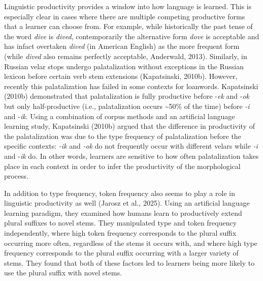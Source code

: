 \documentclass[
  letterpaper,
  DIV=11,
  numbers=noendperiod]{scrartcl}
\begin{document}
Linguistic productivity provides a window into how language is learned.
This is especially clear in cases where there are multiple competing
productive forms that a learner can choose from. For example, while
historically the past tense of the word \emph{dive} is \emph{dived},
contemporarily the alternative form \emph{dove} is acceptable and has
infact overtaken \emph{dived} (in American English) as the more frequent
form (while \emph{dived} also remains perfectly acceptable, Anderwald,
2013). Similarly, in Russian velar stops undergo palatalization without
exceptions in the Russian lexicon before certain verb stem extensions
(Kapatsinski, 2010b). However, recently this palatalization has failed
in some contexts for loanwords. Kapatsinski (2010b) demonstrated that
palatalization is fully productive before -\emph{ek} and -\emph{ok} but
only half-productive (i.e., palatalization occurs \textasciitilde50\% of
the time) before \emph{-i} and -\emph{ik}. Using a combination of corpus
methods and an artificial language learning study, Kapatsinski (2010b)
argued that the difference in productivity of the palatalization was due
to the type frequency of palatalization before the specific contexts:
\emph{-ik} and \emph{-ok} do not frequently occur with different velars
while \emph{-i} and -\emph{ik} do. In other words, learners are
sensitive to how often palatalization takes place in each context in
order to infer the productivity of the morphological process.

In addition to type frequency, token frequency also seems to play a role
in linguistic productivity as well (Jarosz et al., 2025). Using an
artificial language learning paradigm, they examined how humans learn to
productively extend plural suffixes to novel stems. They manipulated
type and token frequency independently, where high token frequency
corresponds to the plural suffix occurring more often, regardless of the
stems it occurs with, and where high type frequency corresponds to the
plural suffix occurring with a larger variety of stems. They found that
both of these factors led to learners being more likely to use the
plural suffix with novel stems.
\end{document}
